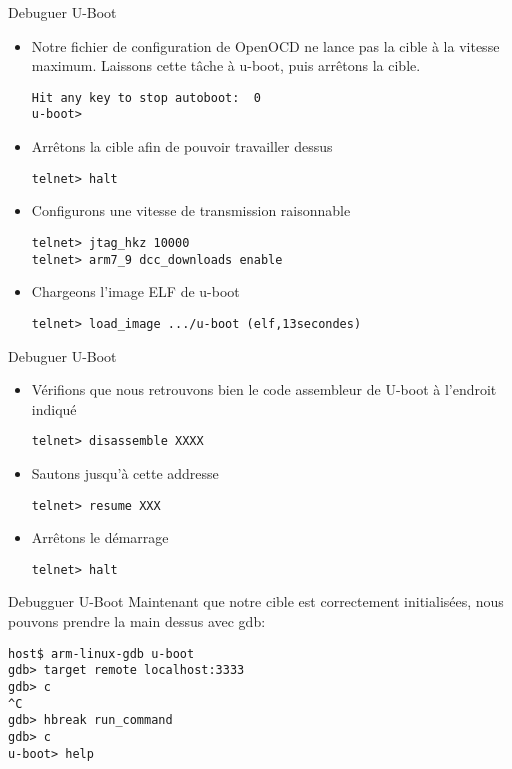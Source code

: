 \begin{frame}[fragile=singleslide]{Debuguer U-Boot}
  \begin{itemize}
  \item  Notre fichier  de configuration  de OpenOCD  ne lance  pas la
    cible à la  vitesse maximum.  Laissons cette tâche  à u-boot, puis
    arrêtons la cible.
    \begin{lstlisting}
Hit any key to stop autoboot:  0
u-boot>
    \end{lstlisting}
  \item Arrêtons la cible afin de pouvoir travailler dessus
    \begin{lstlisting}
telnet> halt
    \end{lstlisting}
  \item Configurons une vitesse de transmission raisonnable
    \begin{lstlisting}
telnet> jtag_hkz 10000
telnet> arm7_9 dcc_downloads enable
    \end{lstlisting}
  \item Chargeons l'image ELF de u-boot
    \begin{lstlisting}
telnet> load_image .../u-boot (elf,13secondes)
    \end{lstlisting}
  \end{itemize}
\end{frame}

\begin{frame}[fragile=singleslide]{Debuguer U-Boot}
  \begin{itemize}
  \item Vérifions que nous retrouvons bien le code assembleur de U-boot à l'endroit indiqué
    \begin{lstlisting}
telnet> disassemble XXXX
    \end{lstlisting}
  \item Sautons jusqu'à cette addresse
    \begin{lstlisting}
telnet> resume XXX
    \end{lstlisting}
  \item Arrêtons le démarrage
    \begin{lstlisting}
telnet> halt
    \end{lstlisting}
  \end{itemize}
\end{frame}

\begin{frame}[fragile=singleslide]{Debugguer U-Boot}
  Maintenant que notre cible est correctement initialisées, nous pouvons prendre la main dessus avec gdb:
  \begin{lstlisting}
host$ arm-linux-gdb u-boot
gdb> target remote localhost:3333
gdb> c
^C
gdb> hbreak run_command
gdb> c
u-boot> help
\end{lstlisting}
\end{frame}

